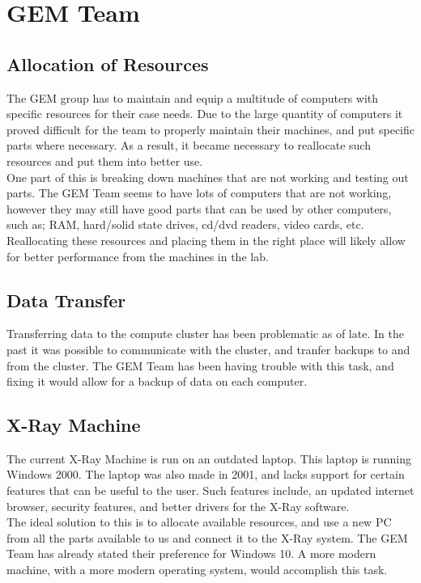 \documentclass[12pt]{article}
\newcommand\tab[1][1cm]{\hspace*{#1}}
\begin{document}
\section*{GEM Team}
%
\subsection*{Allocation of Resources}
%
\tab The GEM group has to maintain and equip a multitude of computers with specific resources for their case needs. Due to the large quantity of computers it proved difficult for the team to properly maintain their machines, and put specific parts where necessary. As a result, it became necessary to reallocate such resources and put them into better use. \\
\tab One part of this is breaking down machines that are not working and testing out parts. The GEM Team seems to have lots of computers that are not working, however they may still have good parts that can be used by other computers, such as; RAM, hard/solid state drives, cd/dvd readers, video cards, etc. Reallocating these resources and placing them in the right place will likely allow for better performance from the machines in the lab.
\subsection*{Data Transfer}
%
\tab Transferring data to the compute cluster has been problematic as of late. In the past it was possible to communicate with the cluster, and tranfer backups to and from the cluster. The GEM Team has been having trouble with this task, and fixing it would allow for a backup of data on each computer.
\subsection*{X-Ray Machine}
%
\tab The current X-Ray Machine is run on an outdated laptop. This laptop is running Windows 2000. The laptop was also made in 2001, and lacks support for certain features that can be useful to the user. Such features include, an updated internet browser, security features, and better drivers for the X-Ray software. \\
\tab The ideal solution to this is to allocate available resources, and use a new PC from all the parts available to us and connect it to the X-Ray system. The GEM Team has already stated their preference for Windows 10. A more modern machine, with a more modern operating system, would accomplish this task. 
\end{document}
